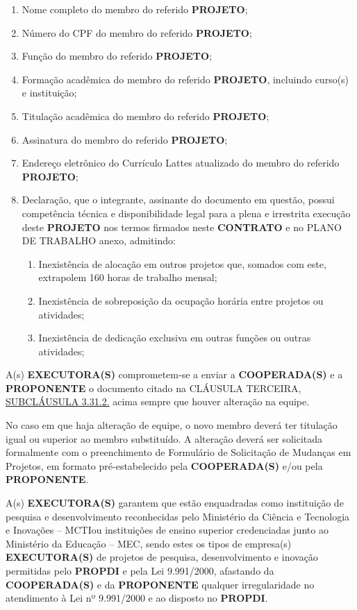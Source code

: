 \begin{enumerate}[label=\alph*), leftmargin=3cm]
    \item Nome completo do membro do referido \textbf{PROJETO};
    \item Número do CPF do membro do referido \textbf{PROJETO};
    \item Função do membro do referido \textbf{PROJETO};
    \item Formação acadêmica do membro do referido \textbf{PROJETO}, incluindo curso(s) e instituição;
    \item Titulação acadêmica do membro do referido \textbf{PROJETO};
    \item Assinatura do membro do referido \textbf{PROJETO};
    \item Endereço eletrônico do Currículo Lattes atualizado do membro do referido \textbf{PROJETO};
    \item Declaração, que o integrante, assinante do documento em questão, possui competência técnica e disponibilidade legal para a plena e irrestrita execução deste \textbf{PROJETO} nos termos firmados neste \textbf{CONTRATO} e no PLANO DE TRABALHO anexo, admitindo:
          \begin{enumerate}[label=\roman*.]
              \item Inexistência de alocação em outros projetos que, somados com este, extrapolem 160 horas de trabalho mensal;
              \item Inexistência de sobreposição da ocupação horária entre projetos ou atividades;
              \item Inexistência de dedicação exclusiva em outras funções ou outras atividades;
          \end{enumerate}

\end{enumerate}

\xxx  A(s) \textbf{EXECUTORA(S)} comprometem-se a enviar a \textbf{COOPERADA(S)} e a \textbf{PROPONENTE} o documento citado na CLÁUSULA TERCEIRA, \hyperlink{3.31.2}{SUBCLÁUSULA 3.31.2.} acima sempre que houver alteração na equipe.

\xxx  No caso em que haja alteração de equipe, o novo membro deverá ter titulação igual ou superior ao membro substituído. A alteração deverá ser solicitada formalmente com o preenchimento de Formulário de Solicitação de Mudanças em Projetos, em formato pré-estabelecido pela \textbf{	COOPERADA(S)} e/ou pela \textbf{PROPONENTE}.

\xx A(s) \textbf{EXECUTORA(S)} garantem que estão enquadradas como instituição de pesquisa e desenvolvimento reconhecidas pelo Ministério da Ciência e Tecnologia e Inovações – MCTIou instituições de ensino superior credenciadas junto ao Ministério da Educação – MEC, sendo estes os tipos de empresa(s) \textbf{EXECUTORA(S)} de projetos de pesquisa, desenvolvimento e inovação permitidas pelo \textbf{PROPDI} e pela Lei 9.991/2000, afastando da \textbf{COOPERADA(S)} e da \textbf{PROPONENTE} qualquer irregularidade no atendimento à Lei nº 9.991/2000 e ao disposto no \textbf{PROPDI}.


